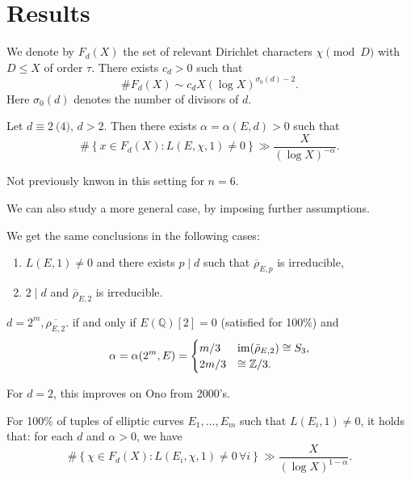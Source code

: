 \documentclass[reqno]{amsart} 
\begin{document}
\section{Results}
We denote by $F_d(X)$ the set of relevant Dirichlet characters $\chi \pmod{D}$ with $D \leq X$ of order $\tau$.  There exists $c_d > 0$ such that
\begin{equation*}
  \# F_d(X) \sim c_d X(\log X)^{\sigma_0(d) - 2}.
\end{equation*}
Here $\sigma_0(d)$ denotes the number of divisors of $d$.
\begin{theorem} [Kriz--N 23]
  Let $d \equiv 2\pod{4}$, $d > 2$.  Then there exists $\alpha = \alpha(E, d) > 0$ such that
  \begin{equation*}
    \# \left\{ x \in F_d(X) : L(E, \chi, 1) \neq 0 \right\} \gg \frac{X}{(\log X)^{- \alpha}}.
  \end{equation*}
\end{theorem}
\begin{remark}
  Not previously knwon in this setting for $n=6$.
\end{remark}

We can also study a more general case, by imposing further assumptions.
\begin{theorem}
  We get the same conclusions in the following cases:
  \begin{enumerate}
  \item $L(E, 1) \neq 0$ and there exists $p \mid d$ such that $\overline{\rho}_{E, p}$ is irreducible,
  \item $2 \mid d$ and $\overline{\rho}_{E, 2}$ is irreducible.
  \end{enumerate}
\end{theorem}


\begin{remark}
  $d = 2^m, \overline{\rho_{E, 2}}$. if and only if $E(\mathbb{Q})[2] = 0$ (satisfied for 100\%) and
  \begin{equation*}
    \alpha = \alpha(2^m, E)
    =
    \begin{cases}
      m/3        & \operatorname{im}(\bar{\rho}_{E, 2}) \cong S_3, \\
      2 m / 3                   &   \cong \mathbb{Z}/3.
    \end{cases}
  \end{equation*}
\end{remark}


For $d = 2$, this improves on Ono from 2000's.

\begin{theorem}
  For 100\% of tuples of elliptic curves $E_1, \dotsc, E_m$ such that $L(E_i, 1) \neq 0$, it holds that: for each $d$ and $\alpha > 0$, we have
  \begin{equation*}
    \# \left\{ \chi \in F_d(X) : L(E_i, \chi, 1) \neq 0 \,\forall i \right\} \gg \frac{X}{(\log X)^{1 - \alpha}}.
  \end{equation*}
\end{theorem}
\end{document}
